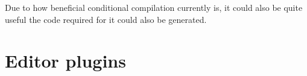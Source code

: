 

Due to how beneficial conditional compilation currently is, it could also be quite useful the code required for it could also be generated.

\section{Editor plugins}


